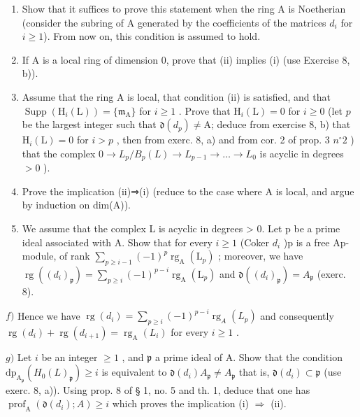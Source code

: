 \begin{enumerate}
\def\labelenumi{\alph{enumi})}
\item
  Show that it suffices to prove this statement when the ring A is Noetherian (consider the subring of A generated by the coefficients of the matrices \(d_{i}\) for \(i \geqslant 1\)). From now on, this condition is assumed to hold.
\item
  If A is a local ring of dimension 0, prove that (ii) implies (i) (use Exercise 8, b)).
\item
  Assume that the ring A is local, that condition (ii) is satisfied, and that \(\operatorname{Supp}(\mathrm{H}_i(\mathrm{L})) = \{\mathfrak{m}_{\mathrm{A}}\}\) for \(i \geqslant 1\) . Prove that \(\mathrm{H}_i(\mathrm{L}) = 0\) for \(i \geqslant 0\) (let \(p\) be the largest integer such that \(\mathfrak{d}(d_p) \neq \mathrm{A}\); deduce from exercise 8, b) that \(\mathrm{H}_i(\mathrm{L}) = 0\) for \(i > p\) , then from exerc. 8, a) and from cor. 2 of prop. 3 \(n^{\circ} 2\) ) that the complex \(0 \to L_p / B_p(L) \to L_{p-1} \to \ldots \to L_0\) is acyclic in degrees \(>0\) ).
\item
  Prove the implication (ii)⇒(i) (reduce to the case where A is local, and argue by induction on dim(A)).
\item
  We assume that the complex L is acyclic in degrees \textgreater{} 0. Let p be a prime ideal associated with A. Show that for every \(i \geqslant 1\) (Coker \(d_{i}\) )p is a free Ap-module, of rank \(\sum_{p \geqslant i-1} (-1)^{p} \operatorname{rg}_{\mathrm{A}}(\mathrm{L}_{p})\) ; moreover, we have \(\operatorname{rg}((d_{i})_{\mathfrak{p}}) = \sum_{p \geqslant i} (-1)^{p-i} \operatorname{rg}_{\mathrm{A}}(\mathrm{L}_{p})\) and \(\mathfrak{d}((d_{i})_{\mathfrak{p}}) = A_{\mathfrak{p}}\) (exerc. 8).
\end{enumerate}

\(f)\) Hence we have \(\operatorname{rg}(d_i) = \sum_{p \geqslant i} (-1)^{p - i} \operatorname{rg}_A(L_p)\) and consequently \(\operatorname{rg}(d_i) + \operatorname{rg}(d_{i+1}) = \operatorname{rg}_\mathrm{A}(L_i)\) for every \(i \geqslant 1\) .

\(g)\) Let \(i\) be an integer \(\geqslant 1\) , and \(\mathfrak{p}\) a prime ideal of \(\mathrm{A}\). Show that the condition \(\mathrm{dp}_{\mathrm{A}_{\mathfrak{p}}}(H_0(L)_{\mathfrak{p}}) \geqslant i\) is equivalent to \(\mathfrak{d}(d_i)A_{\mathfrak{p}} \neq A_{\mathfrak{p}}\) that is, \(\mathfrak{d}(d_i) \subset \mathfrak{p}\) (use exerc. 8, a)). Using prop. 8 of § 1, no. 5 and th. 1, deduce that one has \(\operatorname{prof}_{\mathrm{A}}(\mathfrak{d}(d_i); A) \geqslant i\) which proves the implication (i) \(\Rightarrow\) (ii).

